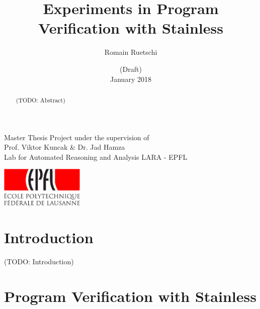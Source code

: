 \documentclass[a4paper,twoside]{article}
\title{Experiments in Program Verification with Stainless}
\date{
  {\small (Draft)}\\
  January 2018
}
\author{Romain Ruetschi}
\makeatletter
\newcommand*{\flipmargins}{%
  \clearpage
  \setlength{\@tempdima}{\oddsidemargin}%
  \setlength{\oddsidemargin}{\evensidemargin}%
  \setlength{\evensidemargin}{\@tempdima}%
  \if@reversemargin
    \normalmarginpar
  \else
    \reversemarginpar
  \fi
}
\newcommand{\TODO}[1]{\textcolor{YellowOrange}{(TODO: #1)}} %
\makeatother
\begin{document}
\maketitle

\vfill

\begin{abstract}

\TODO{Abstract}

\end{abstract}

\vfill

\begin{center}
    Master Thesis Project under the supervision of \\
    Prof. Viktor Kuncak \& Dr. Jad Hamza \\
    Lab for Automated Reasoning and Analysis LARA - EPFL
\end{center}

\begin{center}
    \includegraphics[width = 40mm]{res/epfl-logo}
\end{center}

\clearpage\null\newpage

\restoregeometry              %
\flipmargins
\pagestyle{mystyle_no_header}

\tableofcontents

\clearpage
\pagestyle{mystyle}


\section{Introduction}

\TODO{Introduction}

\clearpage

\section{Program Verification with Stainless}
\label{verif}
\end{document}

